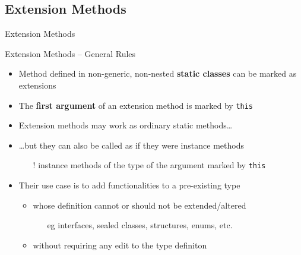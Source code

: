 \documentclass[presentation]{beamer}
\begin{document}
\subsection{Extension Methods}

\begin{frame}[allowframebreaks]{Extension Methods}
  \begin{block}{Extension Methods -- General Rules}
    \begin{itemize}
      \item Method defined in non-generic, non-nested \textbf{static classes} can be marked as extensions
      \item The \textbf{first argument} of an extension method is marked by \alert{\texttt{this}}
      \item Extension methods may work as ordinary static methods\ldots
      \item \ldots but they can also be called as if they were instance methods
      \begin{itemize}
        \item[!] instance methods of the type of the argument marked by \texttt{this}
      \end{itemize}
      \item Their use case is to add functionalities to a pre-existing type
      \begin{itemize}
        \item whose definition cannot or should not be extended/altered
        \begin{itemize}
          \item[eg] interfaces, sealed classes, structures, enums, etc.
        \end{itemize}
        \item without requiring any edit to the type definiton
      \end{itemize}
    \end{itemize}
  \end{block}

  \framebreak


\end{frame}
\end{document}
